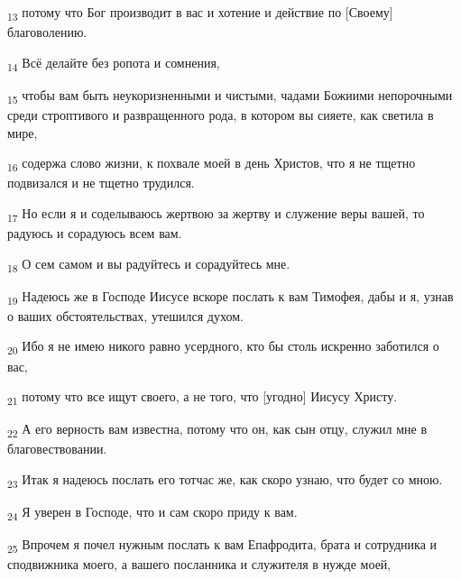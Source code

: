 \begin{tcolorbox}
\textsubscript{13} потому что Бог производит в вас и хотение и действие по [Своему] благоволению.
\end{tcolorbox}
\begin{tcolorbox}
\textsubscript{14} Всё делайте без ропота и сомнения,
\end{tcolorbox}
\begin{tcolorbox}
\textsubscript{15} чтобы вам быть неукоризненными и чистыми, чадами Божиими непорочными среди строптивого и развращенного рода, в котором вы сияете, как светила в мире,
\end{tcolorbox}
\begin{tcolorbox}
\textsubscript{16} содержа слово жизни, к похвале моей в день Христов, что я не тщетно подвизался и не тщетно трудился.
\end{tcolorbox}
\begin{tcolorbox}
\textsubscript{17} Но если я и соделываюсь жертвою за жертву и служение веры вашей, то радуюсь и сорадуюсь всем вам.
\end{tcolorbox}
\begin{tcolorbox}
\textsubscript{18} О сем самом и вы радуйтесь и сорадуйтесь мне.
\end{tcolorbox}
\begin{tcolorbox}
\textsubscript{19} Надеюсь же в Господе Иисусе вскоре послать к вам Тимофея, дабы и я, узнав о ваших обстоятельствах, утешился духом.
\end{tcolorbox}
\begin{tcolorbox}
\textsubscript{20} Ибо я не имею никого равно усердного, кто бы столь искренно заботился о вас,
\end{tcolorbox}
\begin{tcolorbox}
\textsubscript{21} потому что все ищут своего, а не того, что [угодно] Иисусу Христу.
\end{tcolorbox}
\begin{tcolorbox}
\textsubscript{22} А его верность вам известна, потому что он, как сын отцу, служил мне в благовествовании.
\end{tcolorbox}
\begin{tcolorbox}
\textsubscript{23} Итак я надеюсь послать его тотчас же, как скоро узнаю, что будет со мною.
\end{tcolorbox}
\begin{tcolorbox}
\textsubscript{24} Я уверен в Господе, что и сам скоро приду к вам.
\end{tcolorbox}
\begin{tcolorbox}
\textsubscript{25} Впрочем я почел нужным послать к вам Епафродита, брата и сотрудника и сподвижника моего, а вашего посланника и служителя в нужде моей,
\end{tcolorbox}
